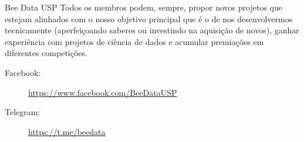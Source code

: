 \begin{subsecao}{Bee Data USP}
Todos os membros podem, sempre, propor novos projetos que estejam alinhados com
o nosso objetivo principal que é o de nos desenvolvermos tecnicamente (aperfeiçoando
saberes ou investindo na aquisição de novos), ganhar experiência com projetos de
ciência de dados e acumular premiações em diferentes competições.

\begin{description}
  \item[Facebook:] \url{https://www.facebook.com/BeeDataUSP}
  \item[Telegram:] \url{https://t.me/beedata}
\end{description}

\end{subsecao}
